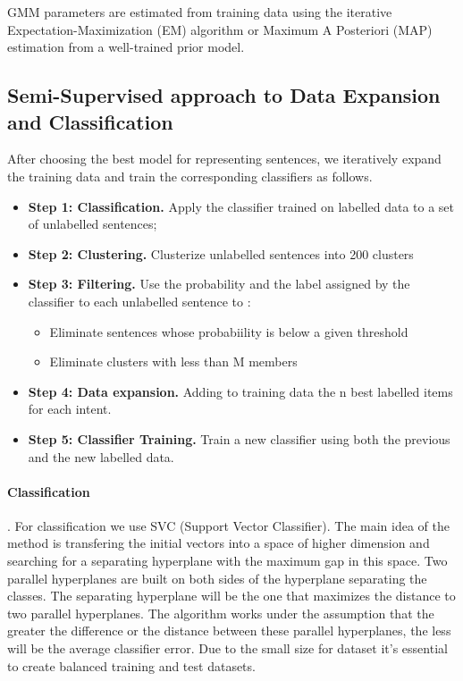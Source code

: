 \documentclass[11pt]{article}
\begin{document}
GMM parameters are estimated from training data using the iterative Expectation-Maximization (EM) algorithm or Maximum A Posteriori (MAP) estimation from a well-trained prior model.



\subsection{Semi-Supervised approach to Data Expansion and Classification}
\label{subsec:dataexpansion}

After choosing the best model for representing sentences, we
iteratively expand the training data and train the corresponding
classifiers as follows.


\begin{itemize}
\item \textbf{Step 1: Classification.} Apply the classifier trained on labelled data to a set of unlabelled sentences;
\item \textbf{Step 2: Clustering.} Clusterize unlabelled sentences into 200 clusters
\item \textbf{Step 3: Filtering.} Use the probability and the label assigned by the classifier to each unlabelled sentence to :
  \begin{itemize}
\item Eliminate sentences whose probabiility is below a given threshold
\item Eliminate clusters with less than M members
  \end{itemize}
\item \textbf{Step 4: Data expansion.} Adding to training data the n best labelled items for each intent. 
  \item \textbf{Step 5: Classifier Training.} Train a new classifier using both the previous and the new labelled data. 
\end{itemize}

\paragraph{Classification}. For classification we use SVC (Support Vector Classifier). The main idea of ​​the method is transfering the initial vectors into a space of higher dimension and searching for a separating hyperplane with the maximum gap in this space. Two parallel hyperplanes are built on both sides of the hyperplane separating the classes. The separating hyperplane will be the one that maximizes the distance to two parallel hyperplanes. The algorithm works under the assumption that the greater the difference or the distance between these parallel hyperplanes, the less will be the average classifier error.  Due to the small size for dataset it's essential to create balanced training and test datasets.
\end{document}
